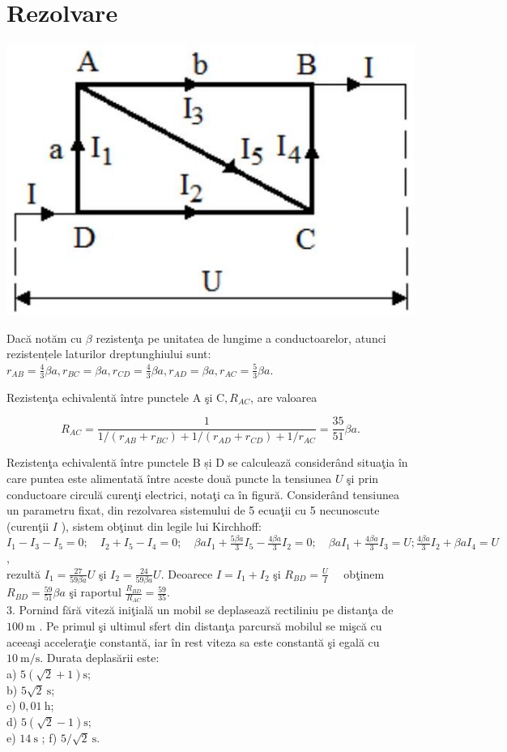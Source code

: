 \section*{Rezolvare}
\begin{center}
\includegraphics[width=0.4\linewidth]{images/2025_08_19_9e83650bd9c853eca85eg-12}
\end{center}

Dacă notăm cu $\beta$ rezistenţa pe unitatea de lungime a conductoarelor, atunci rezistențele laturilor dreptunghiului sunt: $r_{A B}=\frac{4}{3} \beta a, r_{B C}=\beta a, r_{C D}=\frac{4}{3} \beta a, r_{A D}=\beta a, r_{A C}=\frac{5}{3} \beta a$.

Rezistenţa echivalentă între punctele A şi $\mathrm{C}, R_{A C}$, are valoarea

$$
R_{A C}=\frac{1}{1 /\left(r_{A B}+r_{B C}\right)+1 /\left(r_{A D}+r_{C D}\right)+1 / r_{A C}}=\frac{35}{51} \beta a .
$$

Rezistenţa echivalentă între punctele B și D se calculează considerând situaţia în care puntea este alimentată între aceste două puncte la tensiunea $U$ şi prin conductoare circulă curenţi electrici, notaţi ca în figură. Considerând tensiunea un parametru fixat, din rezolvarea sistemului de 5 ecuaţii cu 5 necunoscute (curenţii $I$ ), sistem obţinut din legile lui Kirchhoff:\\
$I_{1}-I_{3}-I_{5}=0 ; \quad I_{2}+I_{5}-I_{4}=0 ; \quad \beta a I_{1}+\frac{5 \beta a}{3} I_{5}-\frac{4 \beta a}{3} I_{2}=0 ; \quad \beta a I_{1}+\frac{4 \beta a}{3} I_{3}=U ; \frac{4 \beta a}{3} I_{2}+\beta a I_{4}=U$,\\
rezultă $I_{1}=\frac{27}{59 \beta a} U$ şi $I_{2}=\frac{24}{59 \beta a} U$. Deoarece $I=I_{1}+I_{2}$ şi $R_{B D}=\frac{U}{I} \quad$ obţinem $R_{B D}=\frac{59}{51} \beta a$ şi raportul $\frac{R_{B D}}{R_{A C}}=\frac{59}{35}$.\\
3. Pornind fără viteză iniţială un mobil se deplasează rectiliniu pe distanţa de $100 \mathrm{~m}$ . Pe primul şi ultimul sfert din distanţa parcursă mobilul se mişcă cu aceeaşi acceleraţie constantă, iar în rest viteza sa este constantă şi egală cu $10 \mathrm{~m} / \mathrm{s}$. Durata deplasării este:\\
a) $5(\sqrt{2}+1) \mathrm{s}$;\\
b) $5 \sqrt{2} \mathrm{~s}$;\\
c) $0,01 \mathrm{~h}$;\\
d) $5(\sqrt{2}-1) \mathrm{s}$;\\
e) $14 \mathrm{~s}$ ; f) $5 / \sqrt{2} \mathrm{~s}$.

